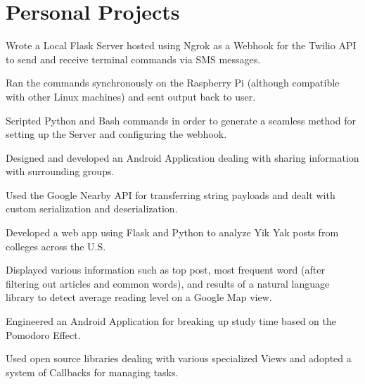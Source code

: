 \documentclass[]{format}
\begin{document}
\begin{minipage}[t]{0.66\textwidth}
\section{Personal Projects}
\begin{tightemize}
\item Wrote a Local Flask Server hosted using Ngrok as a Webhook for the Twilio API to send and receive terminal commands via SMS messages.
\item Ran the commands synchronously on the Raspberry Pi (although compatible with other Linux machines) and sent output back to user.
\item Scripted Python and Bash commands in order to generate a seamless method for setting up the Server and configuring the webhook.
\end{tightemize}
\sectionsep

\begin{tightemize}
\item Designed and developed an Android Application dealing with sharing information with surrounding groups. 
\item Used the Google Nearby API for transferring string payloads and dealt with custom serialization and deserialization.
\end{tightemize}
\sectionsep

\begin{tightemize}
\item Developed a web app using Flask and Python to analyze Yik Yak posts from colleges across the U.S.
\item Displayed various information such as top post, most frequent word (after filtering out articles and common words),
and results of a natural language library to detect average reading level on a Google Map view.
\end{tightemize}
\sectionsep

\begin{tightemize}
\item Engineered an Android Application for breaking up study time based on the Pomodoro Effect.
\item Used open source libraries dealing with various specialized Views and adopted a system of Callbacks for managing tasks.
\end{tightemize}
\end{minipage} 
\end{document}
